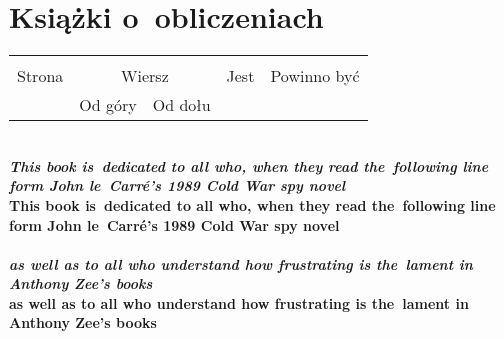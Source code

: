 \documentclass[a4paper,11pt]{article}
\begin{document}
\vspace{\spaceTwo}










\section{Książki o~obliczeniach}

\vspace{\spaceTwo}






\begin{center}

  \begin{tabular}{|c|c|c|c|c|}
    \hline
    & \multicolumn{2}{c|}{} & & \\
    Strona & \multicolumn{2}{c|}{Wiersz} & Jest
                              & Powinno być \\ \cline{2-3}
    & Od góry & Od dołu & & \\
    \hline
    \hline
  \end{tabular}

\end{center}


\noindent
{} \\
\Jest  \textbf{\textit{This book is~dedicated to all who, when they read
    the~following line form John le~Carr\'{e}'s 1989 Cold War spy
    novel}} \\
\Powin \textbf{This book is~dedicated to all who, when they read
  the~following line form John le~Carr\'{e}'s 1989 Cold War spy
  novel} \\
 \\
\Jest  \textbf{\textit{as well as to all who understand how frustrating is
    the~lament in Anthony Zee's books}} \\
\Powin \textbf{as well as to all who understand how frustrating is
  the~lament in Anthony Zee's books} \\
\end{document}
